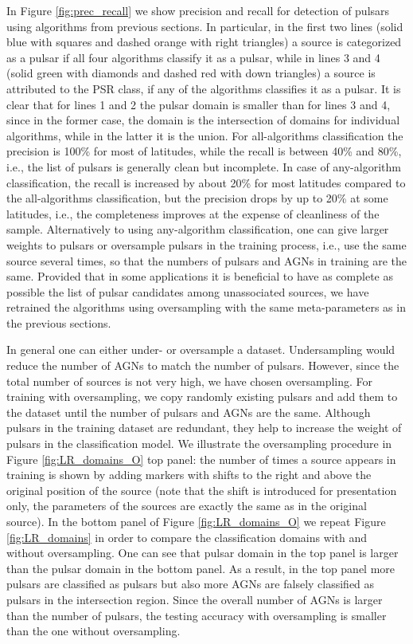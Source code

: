 In Figure \ref{fig:prec_recall} we show precision and recall for detection of pulsars using algorithms from previous sections.
In particular, in the first two lines (solid blue with squares and dashed orange with right triangles) a source is categorized as a pulsar if all four algorithms classify it as a pulsar,
while in lines 3 and 4 (solid green with diamonds and dashed red with down triangles) a source is attributed to the PSR class, if any of the algorithms classifies it as a pulsar.
It is clear that for lines 1 and 2 the pulsar domain is smaller than for lines 3 and 4, since in the former case, the domain is the intersection of domains for individual algorithms, while in the latter it is the union.
For all-algorithms classification the precision is 100\% for most of latitudes, while the recall is between 40\% and 80\%, i.e., the list of pulsars is generally clean but incomplete.
In case of any-algorithm classification, the recall is increased by about 20\% for most latitudes compared to the all-algorithms classification, but the precision drops by up to 20\% at some latitudes, i.e., the completeness improves at the expense of cleanliness of the sample.
Alternatively to using any-algorithm classification, one can give larger weights to pulsars or oversample pulsars in the training process, i.e., use the same source several times, so that the numbers of pulsars and AGNs in training are the same.
Provided that in some applications it is beneficial to have as complete as possible the list of pulsar candidates among unassociated sources, we have retrained the algorithms using oversampling with the same meta-parameters as in the previous sections.

In general one can either under- or oversample a dataset. Undersampling would reduce the number of AGNs to match the number of pulsars. However, since the total number of sources is not very high, we have chosen oversampling. 
For training with oversampling, we copy randomly existing pulsars and add them to the dataset until the number of pulsars and AGNs are the same.
Although pulsars in the training dataset are redundant, they help to increase the weight of pulsars in the classification model.
We illustrate the oversampling procedure in Figure \ref{fig:LR_domains_O} top panel:
the number of times a source appears in training is shown by adding markers with shifts to the right and above the original position of the source (note that the shift is introduced for presentation only, the parameters of the sources are exactly the same as in the original source).
In the bottom panel of Figure \ref{fig:LR_domains_O} we repeat Figure  \ref{fig:LR_domains} in order to compare the classification domains with and without oversampling.
One can see that pulsar domain in the top panel is larger than the pulsar domain in the bottom panel.
As a result, in the top panel more pulsars are classified as pulsars but also more AGNs are falsely classified as pulsars in the intersection region. 
Since the overall number of AGNs is larger than the number of pulsars, the testing accuracy with oversampling is smaller than the one without oversampling.

